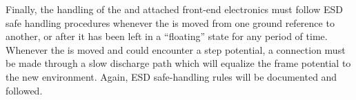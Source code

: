 Finally, the handling of the  and attached front-end electronics must follow ESD safe handling procedures whenever the  is moved from one ground reference to another, or after it has been left in a ``floating'' state for any period of time.  Whenever the  is moved and could encounter a step potential, a connection must be made through a slow discharge path which will equalize the  frame potential to the new environment.  Again, ESD safe-handling rules will be documented and followed.

